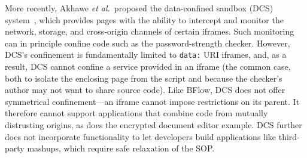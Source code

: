 More recently, Akhawe \emph{et al.}~proposed the data-confined
sandbox (DCS) system~\cite{Akhawe2013}, which provides pages with the
ability to intercept and monitor the network, storage, and cross-origin
channels of certain iframes.
%
Such monitoring can in principle confine code such as the
password-strength checker.
%
However, DCS's confinement is fundamentally limited to \verb|data:|
URI iframes, and, as a result, DCS cannot confine a service provided
in an iframe (the common case, both to isolate the enclosing page from
the script and because the checker's author may not want to share
source code\cite{postman}).
%
Like BFlow, DCS does not offer symmetrical confinement---an iframe
cannot impose restrictions on its parent. It therefore cannot support
applications that combine code from mutually distrusting origins, as
does the encrypted document editor example.
%
%
DCS further does not incorporate functionality to let developers build
applications like third-party mashups, which require safe relaxation of the
SOP.
%





